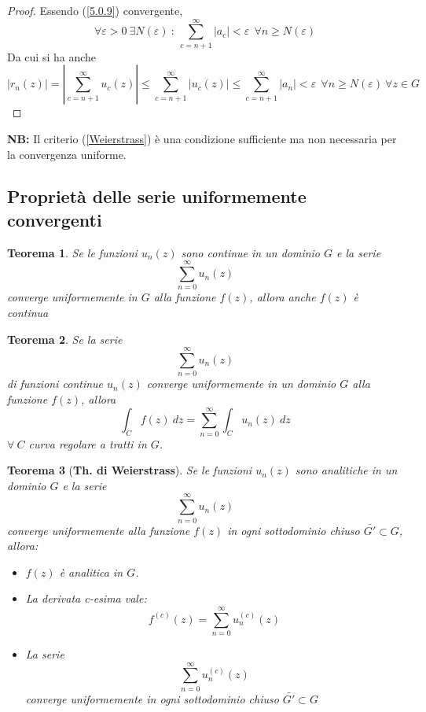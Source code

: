 \documentclass[twoside]{article}
\newtheorem{theorem}{Teorema}[section]
\begin{document}
\begin{proof}
Essendo (\ref{5.0.9}) convergente,
\begin{equation}
    \forall \varepsilon>0 \ \exists N(\varepsilon) \ : \ \sum_{c=n+1}^{\infty} |a_c|<\varepsilon \ \ \forall n \geq N(\varepsilon)
\end{equation}
Da cui si ha anche
\begin{equation}
    |r_n(z)|=\left|\sum_{c=n+1} ^{\infty}u_c(z)\right|\leq \sum_{c=n+1}^{\infty} |u_c(z)| \leq \sum_{c=n+1}^{\infty} |a_n|<\varepsilon \ \ \forall n\geq N(\varepsilon) \ \forall z \in G
\end{equation}
\end{proof}
\textbf{NB:} Il criterio (\ref{Weierstrass}) è una condizione sufficiente ma non necessaria per la convergenza uniforme.

\subsection{Proprietà delle serie uniformemente convergenti}
\begin{theorem}
Se le funzioni $u_n(z)$ sono continue in un dominio $G$ e la serie
\begin{equation}
    \sum_{n=0}^{\infty}u_n(z)
\end{equation}
converge uniformemente in $G$ alla funzione $f(z)$, allora anche $f(z)$ è continua
\end{theorem}

\begin{theorem}
Se la serie
\begin{equation}
    \sum_{n=0}^{\infty} u_n(z)
\end{equation}
di funzioni continue $u_n(z)$ converge uniformemente in un dominio $G$ alla funzione $f(z)$, allora
\begin{equation}
    \int_C f(z) \ dz=\sum_{n=0}^{\infty}\int_C u_n(z) \ dz
\end{equation}
$\forall \ C$ curva regolare a tratti in $G$.
\end{theorem}

\begin{theorem}[\textbf{Th. di Weierstrass}] \label{th weierstrass}
Se le funzioni $u_n(z)$ sono analitiche in un dominio $G$ e la serie
\begin{equation}
    \sum_{n=0}^{\infty} u_n(z)
\end{equation}
converge uniformemente alla funzione $f(z)$ in ogni sottodominio chiuso $\bar{G'}\subset G$, allora:
\begin{itemize}
    \item $f(z)$ è analitica in $G$.
    \item La derivata c-esima vale: \begin{equation} 
        f^{(c)}(z)=\sum_{n=0}^{\infty} u_n ^{(c)}(z)
    \end{equation}
    \item La serie
    \begin{equation}
        \sum_{n=0}^{\infty} u_n ^{(c)} (z)
    \end{equation}
    converge uniformemente in ogni sottodominio chiuso $\bar{G'}\subset G$
    \end{itemize}
\end{theorem}
\end{document}
